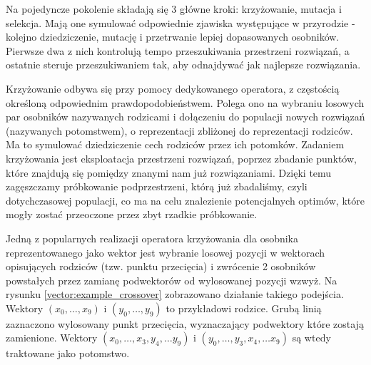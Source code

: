 \documentclass[twoside]{iisthesis}
\begin{document}
Na pojedyncze pokolenie składają się 3 główne kroki: krzyżowanie, mutacja i selekcja. 
Mają one symulować odpowiednie zjawiska występujące w przyrodzie - kolejno dziedziczenie, mutację i przetrwanie lepiej dopasowanych osobników.
Pierwsze dwa z nich kontrolują tempo przeszukiwania przestrzeni rozwiązań, a ostatnie steruje przeszukiwaniem tak, aby odnajdywać jak najlepsze rozwiązania. 

Krzyżowanie odbywa się przy pomocy dedykowanego operatora, z częstością określoną odpowiednim prawdopodobieństwem.
Polega ono na wybraniu losowych par osobników nazywanych rodzicami i dołączeniu do populacji nowych rozwiązań (nazywanych potomstwem), o reprezentacji zbliżonej do reprezentacji rodziców.
Ma to symulować dziedziczenie cech rodziców przez ich potomków.
Zadaniem krzyżowania jest eksploatacja przestrzeni rozwiązań, poprzez zbadanie punktów, które znajdują się pomiędzy znanymi nam już rozwiązaniami.
Dzięki temu zagęszczamy próbkowanie podprzestrzeni, którą już zbadaliśmy, czyli dotychczasowej populacji, co ma na celu znalezienie potencjalnych optimów, które mogły zostać przeoczone przez zbyt rzadkie próbkowanie.

Jedną z popularnych realizacji operatora krzyżowania dla osobnika reprezentowanego jako wektor jest wybranie losowej pozycji w wektorach opisujących rodziców (tzw. punktu przecięcia) i zwrócenie 2 osobników powstałych przez zamianę podwektorów od wylosowanej pozycji wzwyż. 
Na rysunku \ref{vector:example_crossover} zobrazowano działanie takiego podejścia. 
Wektory $(x_0, \ldots, x_9)$ i $(y_0, \ldots, y_9)$ to przykładowi rodzice. 
Grubą linią zaznaczono wylosowany punkt przecięcia, wyznaczający podwektory które zostają zamienione. 
Wektory $(x_0, \ldots, x_3, y_4, \ldots y_9)$ i $(y_0, \ldots, y_3, x_4, \ldots x_9)$ są wtedy traktowane jako potomstwo.
\end{document}
